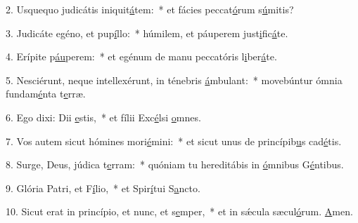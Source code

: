 2. Usquequo judicátis iniquit\uline{á}tem:~* et fácies peccat\uline{ó}rum s\uline{ú}mitis?\par 
3. Judicáte egéno, et pup\uline{í}llo:~* húmilem, et páuperem just\uline{i}fic\uline{á}te.\par 
4. Erípite p\uline{áu}perem:~* et egénum de manu peccatóris l\uline{i}ber\uline{á}te.\par 
5. Nesciérunt, neque intellexérunt, in ténebris \uline{á}mbulant:~* movebúntur ómnia fundam\uline{é}nta t\uline{e}rræ.\par 
6. Ego dixi: Dii \uline{e}stis,~* et fílii Exc\uline{é}lsi \uline{o}mnes.\par 
7. Vos autem sicut hómines mori\uline{é}mini:~* et sicut unus de princípib\uline{u}s cad\uline{é}tis.\par 
8. Surge, Deus, júdica t\uline{e}rram:~* quóniam tu hereditábis in \uline{ó}mnibus G\uline{é}ntibus.\par 
9. Glória Patri, et F\uline{í}lio,~* et Spir\uline{í}tui S\uline{a}ncto.\par 
10. Sicut erat in princípio, et nunc, et s\uline{e}mper,~* et in sǽcula sæcul\uline{ó}rum. \uline{A}men.\par 
